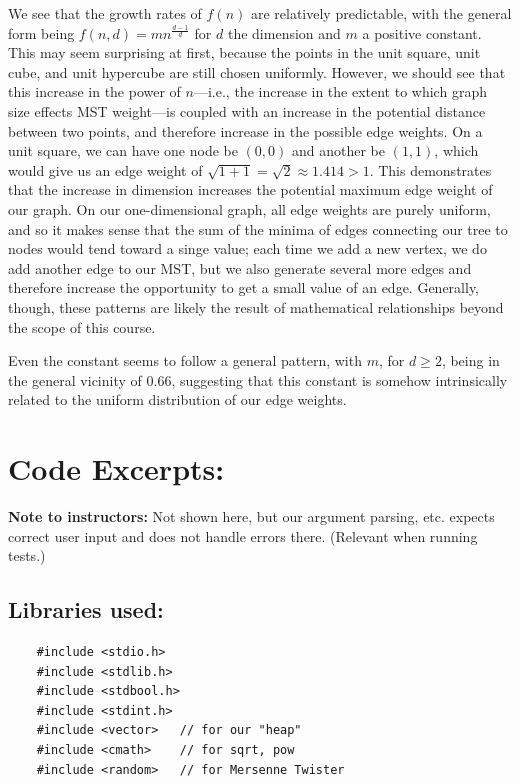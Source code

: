 \documentclass[conference]{styles/acmsiggraph}
\newcommand{\?}{\stackrel{?}{=}}
\begin{document}
We see that the growth rates of $f(n)$ are relatively predictable, with the general form being $f(n,d) = mn^{\frac{d-1}{d}}$ for $d$ the dimension and $m$ a positive constant.  This may seem surprising at first, because the points in the unit square, unit cube, and unit hypercube are still chosen uniformly.  However, we should see that this increase in the power of $n$---i.e., the increase in the extent to which graph size effects MST weight---is coupled with an increase in the potential distance between two points, and therefore increase in the possible edge weights.  On a unit square, we can have one node be $(0,0)$ and another be $(1,1)$, which would give us an edge weight of $\sqrt{1+1}=\sqrt{2}\approx 1.414>1$.  This demonstrates that the increase in dimension increases the potential maximum edge weight of our graph.  On our one-dimensional graph, all edge weights are purely uniform, and so it makes sense that the sum of the minima of edges connecting our tree to nodes would tend toward a singe value; each time we add a new vertex, we do add another edge to our MST, but we also generate several more edges and therefore increase the opportunity to get a small value of an edge.  Generally, though, these patterns are likely the result of mathematical relationships beyond the scope of this course.

Even the constant seems to follow a general pattern, with $m$, for $d\geq 2$, being in the general vicinity of $0.66$, suggesting that this constant is somehow intrinsically related to the uniform distribution of our edge weights.   












\newpage
\section{Code Excerpts:} \label{section:CODE}
\textbf{Note to instructors:} Not shown here, but our argument parsing, etc. expects correct user input and does not handle errors there.  (Relevant when running tests.)

\subsection{Libraries used:}
\begin{verbatim}
    #include <stdio.h>
    #include <stdlib.h>
    #include <stdbool.h>
    #include <stdint.h>
    #include <vector>   // for our "heap"
    #include <cmath>    // for sqrt, pow
    #include <random>   // for Mersenne Twister
\end{verbatim}
\end{document}
